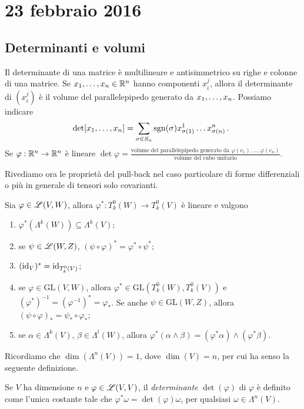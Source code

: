 \chapter{23 febbraio 2016}






\section{Determinanti e volumi}

Il determinante di una matrice è multilineare e antisimmetrico su righe e colonne di una matrice.
Se $\seqb xn, \in\R^n$ hanno componenti $x_i^j$, allora il determinante di $(x_i^j)$ è il volume del parallelepipedo generato da $\seqb xn,$.
Possiamo indicare
\begin{equation*}
	\det[\seqb xn,] = \sum_{\sigma\in S_n} \sgn(\sigma) x_{\sigma(1)}^1\ldots x_{\sigma(n)}^n \punto
\end{equation*}
Se $\varphi:\R^n\to\R^n$ è lineare $\det\varphi = \frac{\text{volume del parallelepipedo generato da $\varphi(e_1),\ldots,\varphi(e_n)$}}{\text{volume del cubo unitario}}$.

Rivediamo ora le proprietà del pull-back nel caso particolare di forme differenziali o più in generale di tensori solo covarianti.
\begin{proposition}
	Sia $\varphi\in\Lin(V,W)$, allora $\varphi^* : T^0_k(W) \to T^0_k(V)$ è lineare e valgono 
	\begin{enumerate}
		\item $\varphi^*(\Lambda^k(W)) \subseteq \Lambda^k(V)$;
		\item se $\psi\in\Lin(W,Z)$, $(\psi\circ\varphi)^* = \varphi^* \circ \psi^*$;
		\item $(\id_V)^* = \id_{T^0_k(V)}$;
		\item se $\varphi\in \mathrm{GL}(V,W)$, allora $\varphi^*\in \mathrm{GL}(T^0_k(W), T^0_k(V))$ e $(\varphi^*)^{-1} = (\varphi^{-1})^* = \varphi_*$. %
		Se anche $\psi\in\mathrm{GL}(W,Z)$, allora $(\psi\circ\varphi)_* = \psi_*\circ \varphi_*$;
		\item se $\alpha\in\Lambda^k(V)$, $\beta\in\Lambda^l(W)$, allora $\varphi^*(\alpha\wedge\beta) = (\varphi^*\alpha) \wedge (\varphi^*\beta)$.
	\end{enumerate}
\end{proposition}

Ricordiamo che $\dim(\Lambda^n(V)) = 1$, dove $\dim(V)=n$, per cui ha senso la seguente definizione.
\begin{definition} 
	Se $V$ ha dimensione $n$ e $\varphi\in\Lin(V,V)$, il \emph{determinante} $\det(\varphi)$ di $\varphi$ è definito come l'unica costante tale che $\varphi^*\omega = \det(\varphi) \omega$, per qualsiasi $\omega\in\Lambda^n(V)$.
\end{definition}

